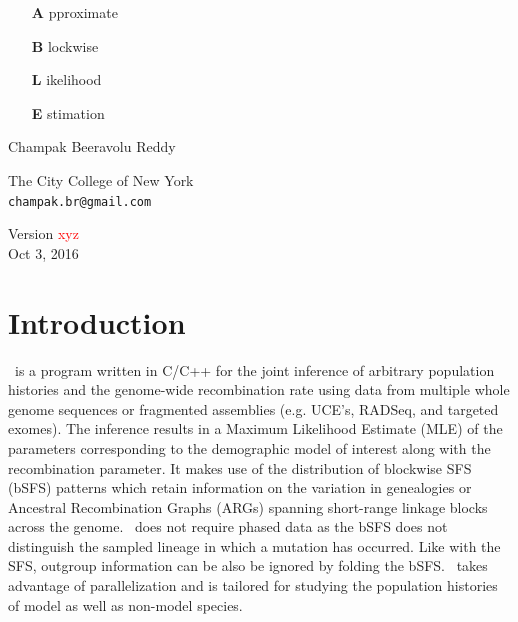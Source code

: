 \documentclass[pdftex,12pt]{article}
\newcommand{\incode}[1]{\tcbox[colback=blue!10!gray!10,colframe=white, on line, size=fbox]{\texttt{\detokenize{#1}}}}
\newcommand{\ABLE}{\incode{ABLE}}
\newcommand{\RED}[1]{\textcolor{red}{#1}}
\begin{document}
\begin{titlepage}
\centering
\vspace*{\fill}

\begin{center}
\begin{adjustwidth}{2.3in}{0in}
	\begin{itemize}
		\item [{\Huge \textbf{A}}] pproximate
		\item [{\Huge \textbf{B}}] lockwise
		\item [{\Huge \textbf{L}}] ikelihood
		\item [{\Huge \textbf{E}}] stimation
	\end{itemize}
\end{adjustwidth}
\end{center}

\vspace{2cm}

{\large Champak Beeravolu Reddy}

\vspace{0.5cm}

{\small The City College of New York} \\
{\small \texttt{champak.br@gmail.com}} \

\vspace{1cm}

Version \RED{xyz} \\
Oct 3, 2016

\vspace*{\fill}
\end{titlepage}

\vspace*{5cm}
\tableofcontents
\vspace*{\fill}

\clearpage


\section{Introduction}
\ABLE\ is a program written in C/C++ for the joint inference of arbitrary population histories and the genome-wide recombination rate using data from multiple whole genome sequences or fragmented assemblies (e.g. UCE's, RADSeq, and targeted exomes). The inference results in a Maximum Likelihood Estimate (MLE) of the parameters corresponding to the demographic model of interest along with the recombination parameter. It makes use of the distribution of blockwise SFS (bSFS) patterns which retain information on the variation in genealogies or Ancestral Recombination Graphs (ARGs) spanning short-range linkage blocks across the genome. \ABLE\ does not require phased data as the bSFS does not distinguish the sampled lineage in which a mutation has occurred. Like with the SFS, outgroup information can be also be ignored by folding the bSFS. \ABLE\ takes advantage of \incode{openmp} parallelization and is tailored for studying the population histories of model as well as non-model species.
\end{document}

